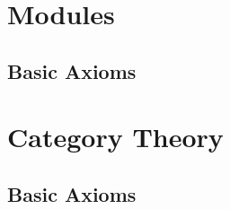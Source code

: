 \documentclass[a4paper,8pt]{article}
\theoremstyle{theorem}
\begin{document}
\newpage


\section{Modules}
\subsection{Basic Axioms}

\newpage

\section{Category Theory}
\subsection{Basic Axioms}
\end{document}
